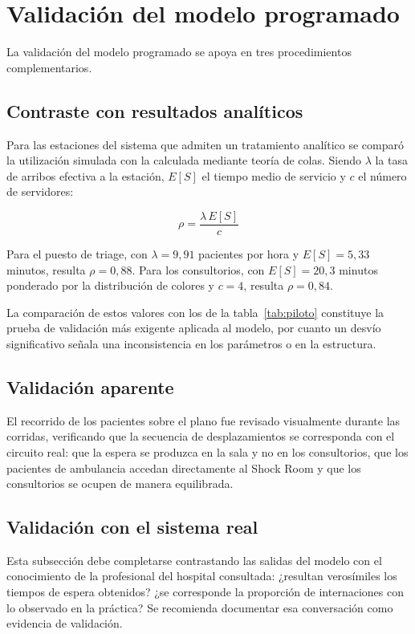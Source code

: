 \section{Validación del modelo programado}

La validación del modelo programado se apoya en tres procedimientos
complementarios.

\subsection{Contraste con resultados analíticos}

Para las estaciones del sistema que admiten un tratamiento analítico se
comparó la utilización simulada con la calculada mediante teoría de colas.
Siendo $\lambda$ la tasa de arribos efectiva a la estación, $E[S]$ el tiempo
medio de servicio y $c$ el número de servidores:

\[
\rho = \frac{\lambda\, E[S]}{c}
\]

Para el puesto de triage, con $\lambda = 9{,}91$ pacientes por hora y
$E[S] = 5{,}33$ minutos, resulta $\rho = 0{,}88$. Para los consultorios, con
$E[S] = 20{,}3$ minutos ponderado por la distribución de colores y $c = 4$,
resulta $\rho = 0{,}84$.

La comparación de estos valores con los de la tabla~\ref{tab:piloto}
constituye la prueba de validación más exigente aplicada al modelo, por
cuanto un desvío significativo señala una inconsistencia en los parámetros o
en la estructura.

\subsection{Validación aparente}

El recorrido de los pacientes sobre el plano fue revisado visualmente durante
las corridas, verificando que la secuencia de desplazamientos se corresponda
con el circuito real: que la espera se produzca en la sala y no en los
consultorios, que los pacientes de ambulancia accedan directamente al Shock
Room y que los consultorios se ocupen de manera equilibrada.

\subsection{Validación con el sistema real}

\begin{pendiente}
Esta subsección debe completarse contrastando las salidas del modelo con el
conocimiento de la profesional del hospital consultada: ¿resultan
verosímiles los tiempos de espera obtenidos? ¿se corresponde la proporción de
internaciones con lo observado en la práctica? Se recomienda documentar esa
conversación como evidencia de validación.
\end{pendiente}

